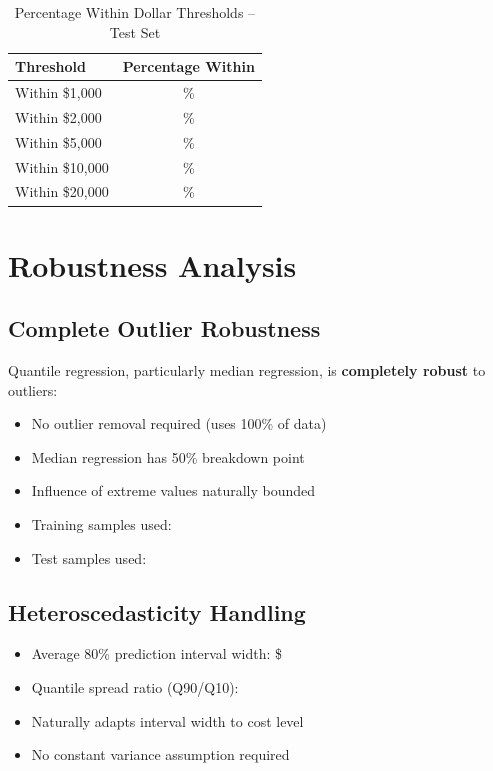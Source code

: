 \begin{table}[h]
\centering
\caption{Percentage Within Dollar Thresholds -- Test Set}
\begin{tabular}{lc}
\toprule
\textbf{Threshold} & \textbf{Percentage Within} \\
\midrule
Within \$1,000 & \ModelSevenWithinOneK{}\% \\
Within \$2,000 & \ModelSevenWithinTwoK{}\% \\
Within \$5,000 & \ModelSevenWithinFiveK{}\% \\
Within \$10,000 & \ModelSevenWithinTenK{}\% \\
Within \$20,000 & \ModelSevenWithinTwentyK{}\% \\
\bottomrule
\end{tabular}
\end{table}

\section{Robustness Analysis}

\subsection{Complete Outlier Robustness}

Quantile regression, particularly median regression, is \textbf{completely robust} to outliers:
\begin{itemize}
    \item No outlier removal required (uses 100\% of data)
    \item Median regression has 50\% breakdown point
    \item Influence of extreme values naturally bounded
    \item Training samples used: \ModelSevenTrainingSamples{}
    \item Test samples used: \ModelSevenTestSamples{}
\end{itemize}

\subsection{Heteroscedasticity Handling}

\begin{itemize}
    \item Average 80\% prediction interval width: \$\ModelSevenPredictionIntervalWidth{}
    \item Quantile spread ratio (Q90/Q10): \ModelSevenQuantileSpread{}
    \item Naturally adapts interval width to cost level
    \item No constant variance assumption required
\end{itemize}

